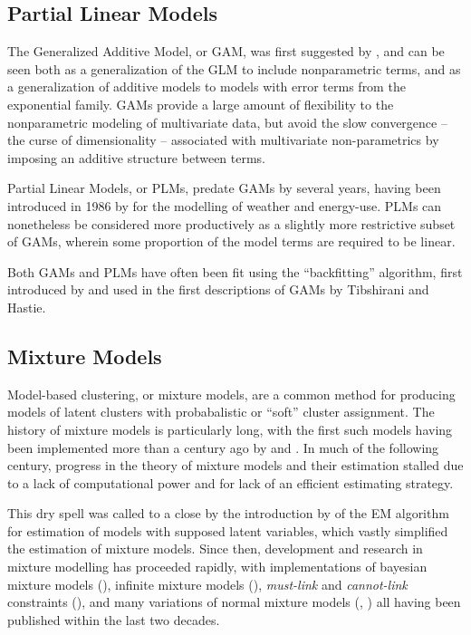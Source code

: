 \documentclass[10pt]{olplainarticle}\usepackage[]{graphicx}\usepackage[]{color}
\begin{document}





\subsection{Partial Linear Models}

The Generalized Additive Model, or GAM, was first suggested by \cite{hastiegam}, and can be seen both as a generalization of the GLM to include nonparametric terms, and as a generalization of additive models to models with error terms from the exponential family. GAMs provide a large amount of flexibility to the nonparametric modeling of multivariate data, but avoid the slow convergence -- the curse of dimensionality -- associated with multivariate non-parametrics by imposing an additive structure between terms. 

Partial Linear Models, or PLMs, predate GAMs by several years, having been introduced in 1986 by \cite{engle} for the modelling of weather and energy-use. PLMs can nonetheless be considered more productively as a slightly more restrictive subset of GAMs, wherein some proportion of the model terms are required to be linear.

Both GAMs and PLMs have often been fit using the ``backfitting'' algorithm, first introduced by \cite{backfit} and used in the first descriptions of GAMs by Tibshirani and Hastie.


\subsection{Mixture Models}

Model-based clustering, or mixture models, are a common method for producing models of latent clusters with probabalistic or ``soft'' cluster assignment. The history of mixture models is particularly long, with the first such models having been implemented more than a century ago by \cite{newcomb} and \cite{pearson}. In much of the following century, progress in the theory of mixture models and their estimation stalled due to a lack of computational power and for lack of an efficient estimating strategy.

This dry spell was called to a close by the introduction by \cite{dempster} of the EM algorithm for estimation of models with supposed latent variables, which vastly simplified the estimation of mixture models. Since then, development and research in mixture modelling has proceeded rapidly, with implementations of bayesian mixture models (\cite{marin}), infinite mixture models (\cite{infinite}), \emph{must-link} and \emph{cannot-link} constraints (\cite{wagstaff}), and many variations of normal mixture models (\cite{mclachlannormal}, \cite{fraley}) all having been published within the last two decades.
\end{document}
